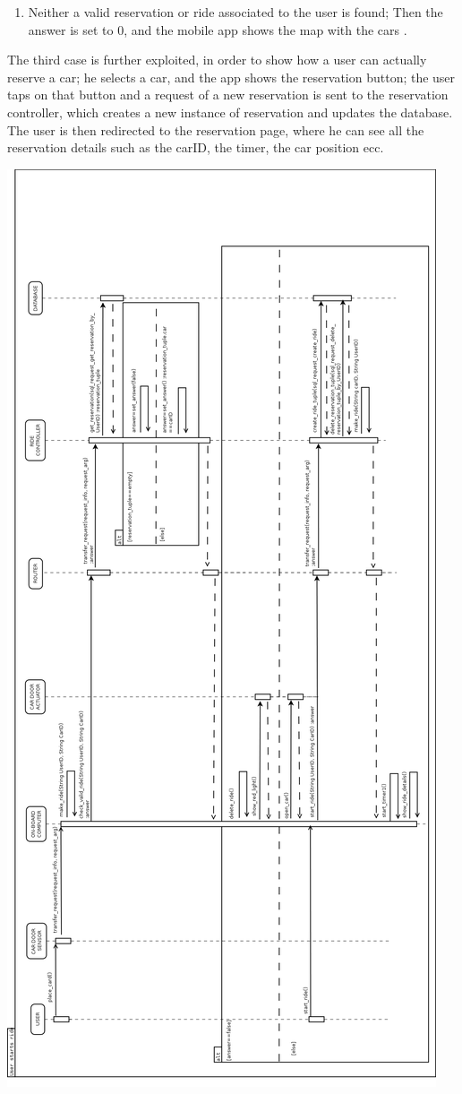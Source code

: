 \documentclass{article}
\begin{document}
\begin{flushleft}
\begin{enumerate}
\item Neither a valid reservation or ride associated to the user is found; Then the answer is set to 0, and the mobile app shows the map with the cars . 
\end{enumerate} 
The third case is further exploited, in order to show how a user can actually reserve a car; he selects a car, and the app shows the reservation button; the user taps on that button and a request of a new reservation is sent to the reservation controller, which creates a new instance of reservation and updates the database. The user is then redirected to the reservation page, where he can see all the reservation details such as the carID, the timer, the car position ecc.


\newpage
\includegraphics[scale=0.25]{seq3_start_ride} 

\end{flushleft}
\end{document}
